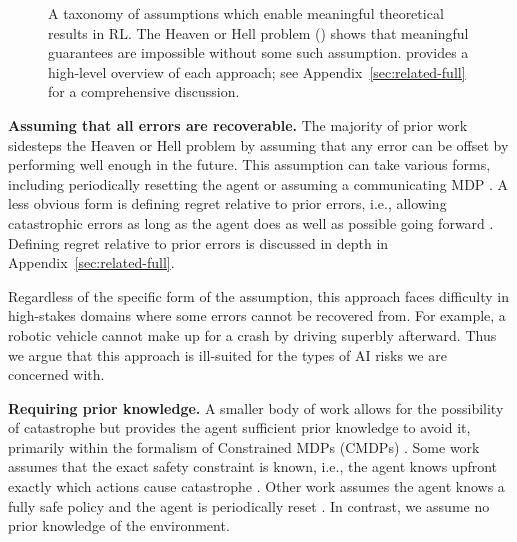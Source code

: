 



\begin{figure*}[b]
\usebox{\taxonomy}
\caption{A taxonomy of assumptions which enable meaningful theoretical results in RL. The Heaven or Hell problem () shows that meaningful guarantees are impossible without some such assumption.  provides a high-level overview of each approach; see Appendix~\ref{sec:related-full} for a comprehensive discussion.}
\label{fig:prior_work}
\end{figure*}


\textbf{Assuming that all errors are recoverable.} The majority of prior work sidesteps the Heaven or Hell problem by assuming that any error can be offset by performing well enough in the future. This assumption can take various forms, including periodically resetting the agent \citep{azar_minimax_2017} or assuming a communicating MDP \cite{jaksch_near-optimal_2010}. A less obvious form is defining regret relative to prior errors, i.e., allowing catastrophic errors as long as the agent does as well as possible going forward  \citep{he2021nearly, lattimore_asymptotically_2011, liu_regret_2021}. Defining regret relative to prior errors is discussed in depth in Appendix~\ref{sec:related-full}. 

Regardless of the specific form of the assumption, this approach faces difficulty in high-stakes domains where some errors cannot be recovered from. For example, a robotic vehicle cannot make up for a crash by driving superbly afterward. Thus we argue that this approach is ill-suited for the types of AI risks we are concerned with.



\textbf{Requiring prior knowledge.} A smaller body of work allows for the possibility of catastrophe but provides the agent sufficient prior knowledge to avoid it, primarily within the formalism of Constrained MDPs (CMDPs) \citep{altman2021constrained}. Some work assumes that the exact safety constraint is known, i.e., the agent knows upfront exactly which actions cause catastrophe \cite{model_zhao_22a, zhao_state-wise_2023}. Other work assumes the agent knows a fully safe policy and the agent is periodically reset \citep{liu2021learning,stradi2024learning}. In contrast, we assume no prior knowledge of the environment.

